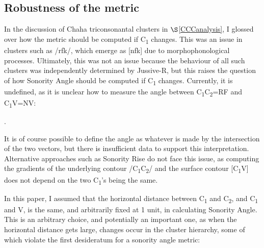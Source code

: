 \documentclass[12pt]{article}
\begin{document}
\subsection{Robustness of the metric}

 In the discussion of Chaha triconsonantal clusters in  $\S$\ref{CCCanalysis}, I glossed over how the metric should be computed if C\textsubscript{1} changes.
This was an issue in clusters such as /rfk/, which emerge as [nfk] due to morphophonological processes. Ultimately, this was not an issue because the behaviour of all such clusters was independently determined by {\sc Jussive-R}, but this raises the question of how {\sc Sonority Angle} should be computed if C\textsubscript{1} changes. Currently, it is undefined, as it is unclear how to measure the angle between C\textsubscript{1}C\textsubscript{2}=RF and C\textsubscript{1}V=NV:

\ex. 

It is of course possible to define the angle as whatever is made by the intersection of the two vectors, but there is insufficient data to support this interpretation. Alternative approaches such as {\sc Sonority Rise} do not face this issue, as computing the gradients of the underlying contour /C\textsubscript{1}C\textsubscript{2}/ and the surface contour [C\textsubscript{1}V] does not depend on the two C\textsubscript{1}'s being the same.

\bigskip

 In this paper, I assumed that the horizontal distance between C\textsubscript{1} and C\textsubscript{2}, and C\textsubscript{1} and V, is the same, and arbitrarily fixed at 1 unit, in calculating {\sc Sonority Angle}. This is an arbitrary choice, and potentially an important one, as when the horizontal distance gets large, changes occur in the cluster hierarchy, some of which violate the first desideratum for a sonority angle metric:
\end{document}
